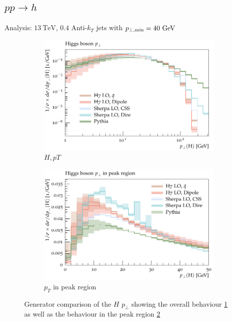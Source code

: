 \subsection{$pp\to h$}
\label{sec:psunc:results:h}
Analysis: $13~\mathrm{TeV}$, $0.4$ Anti-$k_T$ jets with $p_{\perp,\mathrm{min}}=40~\textrm{GeV}$
\begin{figure}[h]
  \centering
  \begin{subfigure}[t]{0.49\textwidth}
    \includegraphics[width=\textwidth]{plots/H-125-MuShower/LH_H/X_pT.pdf}
    \caption{$H, pT$}
    \label{fig:h:pt_full}
  \end{subfigure}
%
  \begin{subfigure}[t]{0.49\textwidth}
    \includegraphics[width=\textwidth]{plots/H-125-MuShower/LH_H/X_pT_peak.pdf}
    \caption{$p_T$ in peak region}
    \label{fig:h:pt_peak}
  \end{subfigure}
  \caption{Generator comparison of the $H$ $p_\perp$ showing the overall behaviour \ref{fig:h:pt_full} as well as the behaviour in the peak region \ref{fig:h:pt_peak}}
  \label{fig:h:pt}
\end{figure}

